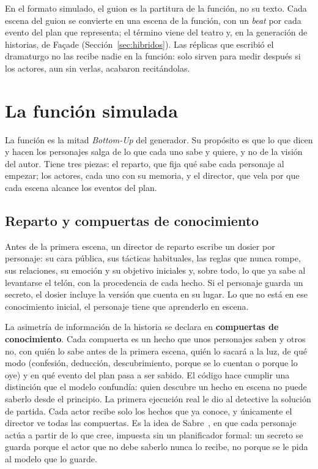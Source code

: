 En el formato simulado, el guion es la partitura de la función, no su texto. Cada escena del guion
se convierte en una escena de la función, con un \textit{beat} por cada evento del plan que
representa; el término viene del teatro y, en la generación de historias, de Façade
(Sección~\ref{sec:hibridos}). Las réplicas que escribió el dramaturgo no las recibe nadie en la
función: solo sirven para medir después si los actores, aun sin verlas, acabaron recitándolas.

\section{La función simulada}\label{sec:funcion}

La función es la mitad \textit{Bottom-Up} del generador. Su propósito es que lo que dicen y hacen
los personajes salga de lo que cada uno sabe y quiere, y no de la visión del autor. Tiene tres
piezas: el reparto, que fija qué sabe cada personaje al empezar; los actores, cada uno con su
memoria, y el director, que vela por que cada escena alcance los eventos del plan.

\subsection{Reparto y compuertas de conocimiento}\label{sec:reparto}

Antes de la primera escena, un director de reparto escribe un dosier por personaje: su cara pública,
sus tácticas habituales, las reglas que nunca rompe, sus relaciones, su emoción y su objetivo
iniciales y, sobre todo, lo que ya sabe al levantarse el telón, con la procedencia de cada hecho. Si
el personaje guarda un secreto, el dosier incluye la versión que cuenta en su lugar. Lo que no está
en ese conocimiento inicial, el personaje tiene que aprenderlo en escena.

La asimetría de información de la historia se declara en \textbf{compuertas de conocimiento}. Cada
compuerta es un hecho que unos personajes saben y otros no, con quién lo sabe antes de la primera
escena, quién lo sacará a la luz, de qué modo (confesión, deducción, descubrimiento, porque se lo
cuentan o porque lo oye) y en qué evento del plan pasa a ser sabido. El código hace cumplir una
distinción que el modelo confundía: quien descubre un hecho en escena no puede saberlo desde el
principio. La primera ejecución real le dio al detective la solución de partida. Cada actor recibe
solo los hechos que ya conoce, y únicamente el director ve todas las compuertas. Es la idea de
Sabre~\cite{ware2021}, en que cada personaje actúa a partir de lo que cree, impuesta sin un
planificador formal: un secreto se guarda porque el actor que no debe saberlo nunca lo recibe, no
porque se le pida al modelo que lo guarde.

